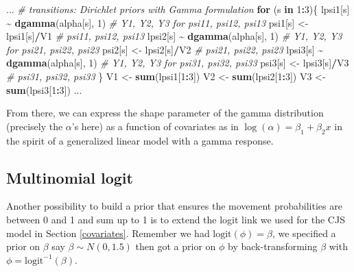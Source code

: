 \documentclass[
  12pt,
]{krantz}
\newenvironment{Shaded}{\begin{snugshade}}{\end{snugshade}}
\newcommand{\CommentTok}[1]{\textcolor[rgb]{0.56,0.35,0.01}{\textit{#1}}}
\newcommand{\ControlFlowTok}[1]{\textcolor[rgb]{0.13,0.29,0.53}{\textbf{#1}}}
\newcommand{\DecValTok}[1]{\textcolor[rgb]{0.00,0.00,0.81}{#1}}
\newcommand{\FunctionTok}[1]{\textcolor[rgb]{0.13,0.29,0.53}{\textbf{#1}}}
\newcommand{\NormalTok}[1]{#1}
\newcommand{\OtherTok}[1]{\textcolor[rgb]{0.56,0.35,0.01}{#1}}
\newcommand{\SpecialCharTok}[1]{\textcolor[rgb]{0.81,0.36,0.00}{\textbf{#1}}}
\begin{document}
\begin{Shaded}
\begin{Highlighting}[]
\NormalTok{...}
\CommentTok{\# transitions: Dirichlet priors with Gamma formulation}
\ControlFlowTok{for}\NormalTok{ (s }\ControlFlowTok{in} \DecValTok{1}\SpecialCharTok{:}\DecValTok{3}\NormalTok{)\{}
\NormalTok{  lpsi1[s] }\SpecialCharTok{\textasciitilde{}} \FunctionTok{dgamma}\NormalTok{(alpha[s], }\DecValTok{1}\NormalTok{) }\CommentTok{\# Y1, Y2, Y3 for psi11, psi12, psi13}
\NormalTok{  psi1[s] }\OtherTok{\textless{}{-}}\NormalTok{ lpsi1[s]}\SpecialCharTok{/}\NormalTok{V1 }\CommentTok{\# psi11, psi12, psi13}
\NormalTok{  lpsi2[s] }\SpecialCharTok{\textasciitilde{}} \FunctionTok{dgamma}\NormalTok{(alpha[s], }\DecValTok{1}\NormalTok{) }\CommentTok{\# Y\textquotesingle{}1, Y\textquotesingle{}2, Y\textquotesingle{}3 for psi21, psi22, psi23}
\NormalTok{  psi2[s] }\OtherTok{\textless{}{-}}\NormalTok{ lpsi2[s]}\SpecialCharTok{/}\NormalTok{V2 }\CommentTok{\# psi21, psi22, psi23}
\NormalTok{  lpsi3[s] }\SpecialCharTok{\textasciitilde{}} \FunctionTok{dgamma}\NormalTok{(alpha[s], }\DecValTok{1}\NormalTok{) }\CommentTok{\# Y\textquotesingle{}\textquotesingle{}1, Y\textquotesingle{}\textquotesingle{}2, Y\textquotesingle{}\textquotesingle{}3 for psi31, psi32, psi33}
\NormalTok{  psi3[s] }\OtherTok{\textless{}{-}}\NormalTok{ lpsi3[s]}\SpecialCharTok{/}\NormalTok{V3 }\CommentTok{\# psi31, psi32, psi33}
\NormalTok{\}}
\NormalTok{V1 }\OtherTok{\textless{}{-}} \FunctionTok{sum}\NormalTok{(lpsi1[}\DecValTok{1}\SpecialCharTok{:}\DecValTok{3}\NormalTok{])}
\NormalTok{V2 }\OtherTok{\textless{}{-}} \FunctionTok{sum}\NormalTok{(lpsi2[}\DecValTok{1}\SpecialCharTok{:}\DecValTok{3}\NormalTok{])}
\NormalTok{V3 }\OtherTok{\textless{}{-}} \FunctionTok{sum}\NormalTok{(lpsi3[}\DecValTok{1}\SpecialCharTok{:}\DecValTok{3}\NormalTok{])}
\NormalTok{...}
\end{Highlighting}
\end{Shaded}

From there, we can express the shape parameter of the gamma distribution (precisely the \(\alpha\)'s here) as a function of covariates as in \(\log(\alpha) = \beta_1 + \beta_2 x\) in the spirit of a generalized linear model with a gamma response.

\subsection{Multinomial logit}\label{multinomiallogit}

Another possibility to build a prior that ensures the movement probabilities are between 0 and 1 and sum up to 1 is to extend the logit link we used for the CJS model in Section \ref{covariates}. Remember we had \(\text{logit}(\phi) = \beta\), we specified a prior on \(\beta\) say \(\beta \sim N(0,1.5)\) then got a prior on \(\phi\) by back-transforming \(\beta\) with \(\phi = \text{logit}^{-1}(\beta)\).
\end{document}
